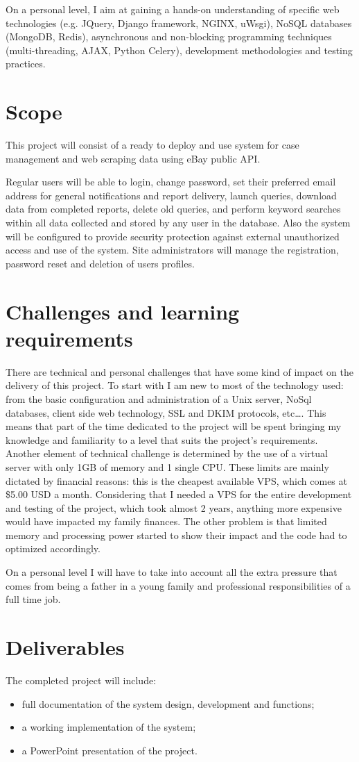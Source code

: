 On a personal level, I aim at gaining a hands-on understanding of specific web
technologies (e.g. JQuery, Django framework, NGINX, uWsgi), NoSQL databases
(MongoDB, Redis), asynchronous and non-blocking programming techniques
(multi-threading, AJAX, Python Celery), development methodologies and testing
practices.


\section{Scope}
This project will consist of a ready to deploy and use system for case
management and web scraping data using eBay public API.

Regular users will be able to login, change password, set their preferred email
address for general notifications and report delivery, launch queries, download
data from completed reports, delete old queries, and perform keyword searches
within all data collected and stored by any user in the database.
Also the system will be configured to provide security protection against external
unauthorized access and use of the system. Site administrators will manage the
registration, password reset and deletion of users profiles.


\section{Challenges and learning requirements}
There are technical and personal challenges that have some kind of impact
on the delivery of this project. To start with I am new to most of the
technology used: from the basic configuration and administration of a Unix
server, NoSql databases, client side web technology, SSL and DKIM protocols,
etc\ldots. This means that part of the time dedicated to the project will be
spent bringing my knowledge and familiarity to a level that suits the project's
requirements. Another element of technical challenge is determined by the use of
a virtual server with only 1GB of memory and 1 single CPU. These limits are
mainly dictated by financial reasons: this is the cheapest available VPS, which
comes at \$5.00 USD a month. Considering that I needed a VPS for the entire
development and testing of the project, which took almost 2 years, anything more
expensive would have impacted my family finances. The other problem is that
limited memory and processing power started to show their impact and the code
had to optimized accordingly.

On a personal level I will have to take into account all the extra pressure
that comes from being a father in a young family and professional
responsibilities of a full time job.


\section{Deliverables}
The completed project will include:

\begin{itemize}
  \item full documentation of the system design, development and functions;
  \item a working implementation of the system;
  \item a PowerPoint presentation of the project.
\end{itemize}


